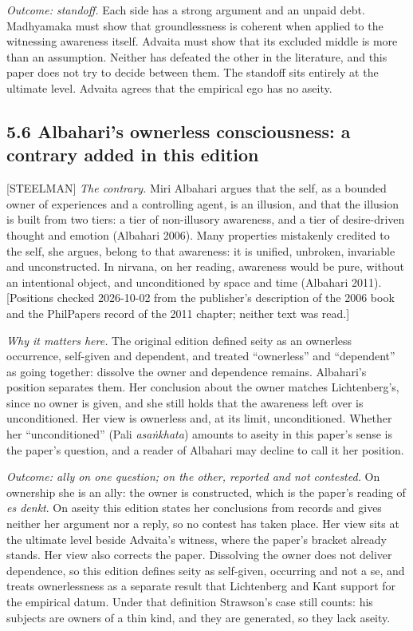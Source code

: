 \documentclass[11pt]{article}
\newcommand{\register}[1]{{\ttfamily\small #1}}
\begin{document}
\emph{Outcome: standoff.} Each side has a strong argument and an unpaid debt. Madhyamaka must show that groundlessness is coherent when applied to the witnessing awareness itself. Advaita must show that its excluded middle is more than an assumption. Neither has defeated the other in the literature, and this paper does not try to decide between them. The standoff sits entirely at the ultimate level. Advaita agrees that the empirical ego has no aseity.

\subsection*{5.6 Albahari's ownerless consciousness: a contrary added in this edition}

\register{[STEELMAN]} \emph{The contrary.} Miri Albahari argues that the self, as a bounded owner of experiences and a controlling agent, is an illusion, and that the illusion is built from two tiers: a tier of non-illusory awareness, and a tier of desire-driven thought and emotion (Albahari 2006). Many properties mistakenly credited to the self, she argues, belong to that awareness: it is unified, unbroken, invariable and unconstructed. In nirvana, on her reading, awareness would be pure, without an intentional object, and unconditioned by space and time (Albahari 2011). [Positions checked 2026-10-02 from the publisher's description of the 2006 book and the PhilPapers record of the 2011 chapter; neither text was read.]

\emph{Why it matters here.} The original edition defined seity as an ownerless occurrence, self-given and dependent, and treated ``ownerless'' and ``dependent'' as going together: dissolve the owner and dependence remains. Albahari's position separates them. Her conclusion about the owner matches Lichtenberg's, since no owner is given, and she still holds that the awareness left over is unconditioned. Her view is ownerless and, at its limit, unconditioned. Whether her ``unconditioned'' (Pali \emph{asaṅkhata}) amounts to aseity in this paper's sense is the paper's question, and a reader of Albahari may decline to call it her position.

\emph{Outcome: ally on one question; on the other, reported and not contested.} On ownership she is an ally: the owner is constructed, which is the paper's reading of \emph{es denkt}. On aseity this edition states her conclusions from records and gives neither her argument nor a reply, so no contest has taken place. Her view sits at the ultimate level beside Advaita's witness, where the paper's bracket already stands. Her view also corrects the paper. Dissolving the owner does not deliver dependence, so this edition defines seity as self-given, occurring and not a se, and treats ownerlessness as a separate result that Lichtenberg and Kant support for the empirical datum. Under that definition Strawson's case still counts: his subjects are owners of a thin kind, and they are generated, so they lack aseity.
\end{document}
